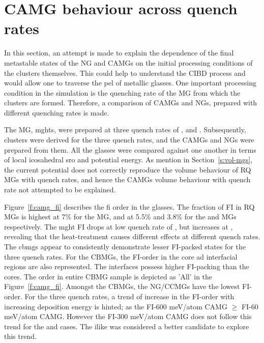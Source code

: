 \section{CAMG behaviour across quench rates} \label{s:camg_quenchrt}

\begin{selfcite}
In this section, an attempt is made to explain the dependence of the final metastable states of the NG and CAMGs on the initial processing conditions of the clusters themselves. This could help to understand the CIBD process and would allow one to traverse the \gls{pel} of metallic glasses. One important processing condition in the simulation is the quenching rate of the MG from which the clusters are formed. Therefore, a comparison of CAMGs and NGs, prepared with different quenching rates is made. \par
\end{selfcite}

The MG, \gls{mght}s, were prepared at three quench rates of ,  and . Subsequently, clusters were derived for the three quench rates, and the CAMGs and NGs were prepared from them. All the glasses were compared against one another in terms of local icosahedral \gls{sro} and potential energy. As mention in Section~\ref{s:vol-mgs}, the current potential does not correctly reproduce the volume behaviour of RQ MGs with quench rates, and hence the CAMGs volume behaviour with quench rate not attempted to be explained. \par

Figure~\ref{f:camg_fi} describes the \gls{fi} order in the glasses. The fraction of FI in RQ MGs is highest at 7\% for the  MG, and at 5.5\% and 3.8\% for the  and  MGs respectively. The \gls{mght} FI drops at low quench rate of , but increases at , revealing that the heat-treatment causes different effects at different quench rates. The \gls{cbmg}s appear to consistently demonstrate lesser FI-packed states for the three quench rates. For the CBMGs, the FI-order in the core ad interfacial regions are also represented. The interfaces possess higher FI-packing than the cores. The order in entire CBMG sample is depicted as 'All' in the Figure~\ref{f:camg_fi}. Amongst the CBMGs, the NG/CCMGs have the lowest FI-order. For the three quench rates, a trend of increase in the FI-order with increasing deposition energy is hinted; as the FI-600 meV/atom CAMG $\geq$ FI-60 meV/atom CAMG. However the FI-300 meV/atom CAMG does not follow this trend for the  and  cases. The \gls{ilike} was considered a better candidate to explore this trend. \par

